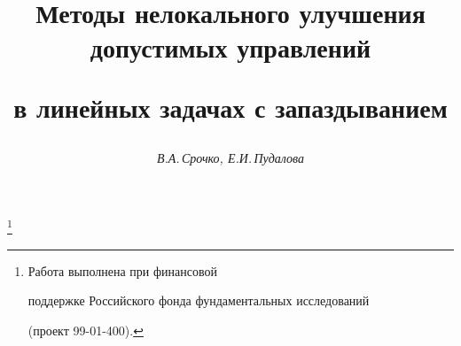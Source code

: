




% 


\newcommand{\sign}{\operatorname{sign}}


\newcommand{\sat}{\operatorname{sat}}


\newcommand{\argmax}{\operatornamewithlimits{arg\,max}}


\newcommand{\tts}[1]{}







\setcounter{page}{78}















\author{\it В.А.\,Срочко, Е.И.\,Пудалова}




\title{Методы нелокального улучшения допустимых управлений


в линейных задачах с запаздыванием}


\thanks{Работа выполнена при финансовой


поддержке Российского фонда фундаментальных исследований


(проект 99-01-400).}





\date{}




\pagestyle{plain} %





